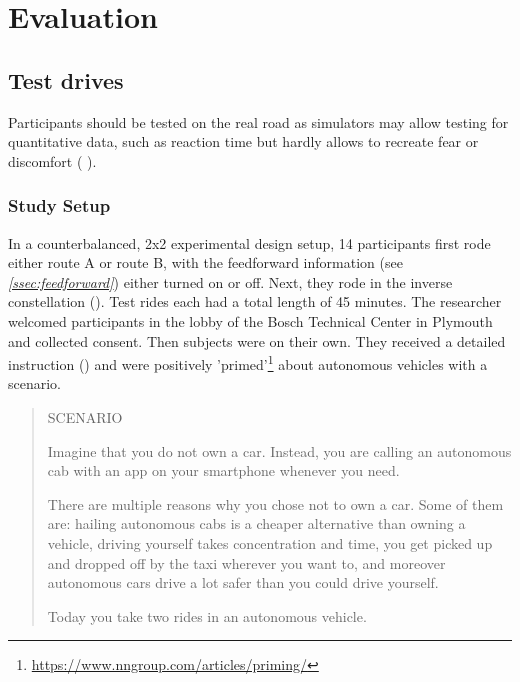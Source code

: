 \chapter{Evaluation}
\label{ch:evaluation}
\section{Test drives}
Participants should be tested on the real road as simulators may allow testing for quantitative data, such as reaction time but hardly allows to recreate fear or discomfort ( \emph{}). 

\subsection{Study Setup}
\label{sec:study}
In a counterbalanced, 2x2 experimental design setup, 
14 participants first rode either route A or route B, with the feedforward information (see \emph{\ref{ssec:feedforward}}) either turned on or off. Next, they rode in the inverse constellation (\emph{}). Test rides each had a total length of 45 minutes. 
The researcher welcomed participants in the lobby of the Bosch Technical Center in Plymouth and collected consent. Then subjects were on their own. They received a detailed instruction (\emph{}) and were positively 'primed'\footnote{\url{https://www.nngroup.com/articles/priming/}} about autonomous vehicles with a scenario.

\begin{quotation}
\begin{center} 
SCENARIO

Imagine that you do not own a car. Instead, you are calling an autonomous cab with an app on your smartphone whenever you need. 

There are multiple reasons why you chose not to own a car. Some of them are: hailing autonomous cabs is a cheaper alternative than owning a vehicle, driving yourself takes concentration and time, you get picked up and dropped off by the taxi wherever you want to, and moreover autonomous cars drive a lot safer than you could drive yourself. 

Today you take two rides in an autonomous vehicle. 
 \end{center}
\end{quotation}

